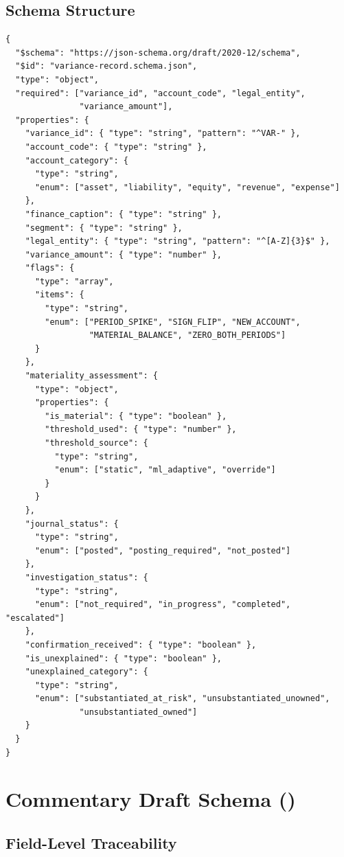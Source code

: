 \subsection{Schema Structure}

\begin{lstlisting}[language=jsonx,caption=Variance Record Schema (simplified)]
{
  "$schema": "https://json-schema.org/draft/2020-12/schema",
  "$id": "variance-record.schema.json",
  "type": "object",
  "required": ["variance_id", "account_code", "legal_entity", 
               "variance_amount"],
  "properties": {
    "variance_id": { "type": "string", "pattern": "^VAR-" },
    "account_code": { "type": "string" },
    "account_category": { 
      "type": "string",
      "enum": ["asset", "liability", "equity", "revenue", "expense"]
    },
    "finance_caption": { "type": "string" },
    "segment": { "type": "string" },
    "legal_entity": { "type": "string", "pattern": "^[A-Z]{3}$" },
    "variance_amount": { "type": "number" },
    "flags": {
      "type": "array",
      "items": {
        "type": "string",
        "enum": ["PERIOD_SPIKE", "SIGN_FLIP", "NEW_ACCOUNT", 
                 "MATERIAL_BALANCE", "ZERO_BOTH_PERIODS"]
      }
    },
    "materiality_assessment": {
      "type": "object",
      "properties": {
        "is_material": { "type": "boolean" },
        "threshold_used": { "type": "number" },
        "threshold_source": {
          "type": "string",
          "enum": ["static", "ml_adaptive", "override"]
        }
      }
    },
    "journal_status": {
      "type": "string",
      "enum": ["posted", "posting_required", "not_posted"]
    },
    "investigation_status": {
      "type": "string",
      "enum": ["not_required", "in_progress", "completed", "escalated"]
    },
    "confirmation_received": { "type": "boolean" },
    "is_unexplained": { "type": "boolean" },
    "unexplained_category": {
      "type": "string",
      "enum": ["substantiated_at_risk", "unsubstantiated_unowned",
               "unsubstantiated_owned"]
    }
  }
}
\end{lstlisting}

\section{Commentary Draft Schema ()}
\label{sec:commentary-draft-schema}

\subsection{Field-Level Traceability}

